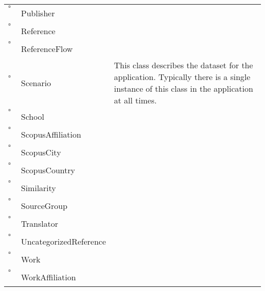 \begin{longtable}{llp{8cm}}
$\square$\ & Publisher &  \\
$\square$\ & Reference &  \\
$\square$\ & ReferenceFlow &  \\
$\square$\ & Scenario & This class describes the dataset for the application. Typically there is a single instance of this class in the application at all times. \\
$\square$\ & School &  \\
$\square$\ & ScopusAffiliation &  \\
$\square$\ & ScopusCity &  \\
$\square$\ & ScopusCountry &  \\
$\square$\ & Similarity &  \\
$\square$\ & SourceGroup &  \\
$\square$\ & Translator &  \\
$\square$\ & UncategorizedReference &  \\
$\square$\ & Work &  \\
$\square$\ & WorkAffiliation &  \\
\end{longtable}

